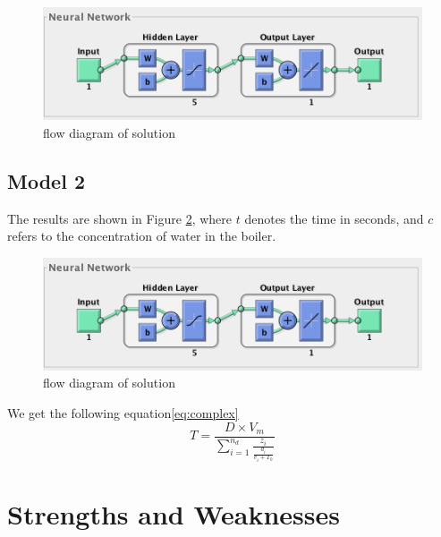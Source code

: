 \documentclass[12pt]{article}  %
\begin{document}
\begin{figure}[htbp]
	\centering
	\includegraphics[width=.6\textwidth]{p1.png}
	\caption{ flow diagram of solution}\label{fig: flow diagram of solution}
\end{figure}



\subsection{Model 2}
The results are shown in Figure \ref{fig: flow diagram of solution}, where $t$ denotes the time in seconds, and $c$ refers to the concentration of water in the boiler.

\begin{figure}[htbp]
\centering
\includegraphics[width=.6\textwidth]{p1.png}
\caption{ flow diagram of solution}\label{fig: flow diagram of solution}
\end{figure}
We get the following equation\eqref{eq:complex}
\begin{equation}\label{eq:complex}
		T=\frac{D\times    V_m}{\sum_{i=1}^{n_d}{\frac{z_i}{\frac{d_i}{v_i+T_0}}}}
\end{equation}
\newpage
\section{Strengths and Weaknesses}
\end{document}
